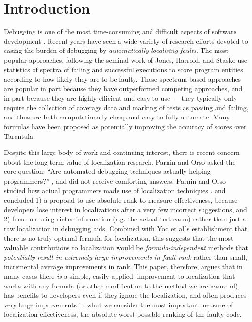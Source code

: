 \section{Introduction}

Debugging is one of the most time-consuming and difficult aspects of
software development \cite{Vesey,BallVis}.  Recent years have seen a
wide variety of research efforts devoted to easing the burden of
debugging by \emph{automatically localizing faults}.  The most popular
approaches, following the seminal work of Jones, Harrold, and Stasko
\cite{Jones2002,Tarantula} use statistics of spectra \cite{RepsSpectra} of
failing and successful executions to score program entities according
to how likely they are to be faulty.  These spectrum-based approaches
are popular in part because they have outperformed competing
approaches, and in part because they are highly efficient and easy to
use --- they typically only require the collection of coverage data
and marking of tests as passing and failing, and thus are both
computationally cheap and easy to fully automate.  Many formulas have
been proposed as potentially improving the accuracy of scores
\cite{Ochai,AMPLE,Pinpoint,StatDebug,Abreu:2006:PRDC} over Tarantula.

Despite this large body of work and continuing interest, there is recent concern about the long-term value
of localization research.  Parnin and Orso asked the core
question: ``Are automated debugging techniques actually helping
programmers?''  \cite{AutoHelp}, and did not receive comforting
answers.  Parnin and Orso studied how actual programmers made use of localization techniques \cite{AutoHelp}.
and concluded 1) a proposal to use absolute rank to
measure effectiveness, because developers lose interest in
localizations after a very few incorrect suggestions, and 2) focus on
using richer information (e.g. the actual test cases) rather than just
a raw localization in debugging aids.  Combined with Yoo et al.'s
establishment \cite{yoo2014no} that there is no truly optimal formula
for localization, this suggests that the most valuable contributions
to localization would be \emph{formula-independent} methods that
\emph{potentially result in extremely large improvements in fault
rank} rather than small, incremental average improvements in rank.
This paper, therefore, argues that in many cases there \emph{is} a
simple, easily applied, improvement to localization that works with
any formula (or other modification to the method we are aware of), has
benefits to developers even if they ignore the localization, and often
produces very large improvements in what we consider the most
important measure of localization effectiveness, the absolute worst
possible ranking of the faulty code.

